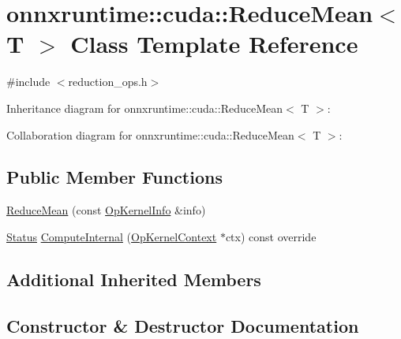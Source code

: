 \hypertarget{classonnxruntime_1_1cuda_1_1ReduceMean}{}\section{onnxruntime\+:\+:cuda\+:\+:Reduce\+Mean$<$ T $>$ Class Template Reference}
\label{classonnxruntime_1_1cuda_1_1ReduceMean}


{\ttfamily \#include $<$reduction\+\_\+ops.\+h$>$}



Inheritance diagram for onnxruntime\+:\+:cuda\+:\+:Reduce\+Mean$<$ T $>$\+:


Collaboration diagram for onnxruntime\+:\+:cuda\+:\+:Reduce\+Mean$<$ T $>$\+:
\subsection*{Public Member Functions}
\begin{DoxyCompactItemize}
\item 
\mbox{\hyperlink{classonnxruntime_1_1cuda_1_1ReduceMean_a3052a29172222b0836895ff44395fa57}{Reduce\+Mean}} (const \mbox{\hyperlink{classonnxruntime_1_1OpKernelInfo}{Op\+Kernel\+Info}} \&info)
\item 
\mbox{\hyperlink{classonnxruntime_1_1common_1_1Status}{Status}} \mbox{\hyperlink{classonnxruntime_1_1cuda_1_1ReduceMean_a8a8901b51c3f9861ae02318744b246af}{Compute\+Internal}} (\mbox{\hyperlink{classonnxruntime_1_1OpKernelContext}{Op\+Kernel\+Context}} $\ast$ctx) const override
\end{DoxyCompactItemize}
\subsection*{Additional Inherited Members}


\subsection{Constructor \& Destructor Documentation}
\mbox{\label{classonnxruntime_1_1cuda_1_1ReduceMean_a3052a29172222b0836895ff44395fa57}} 

